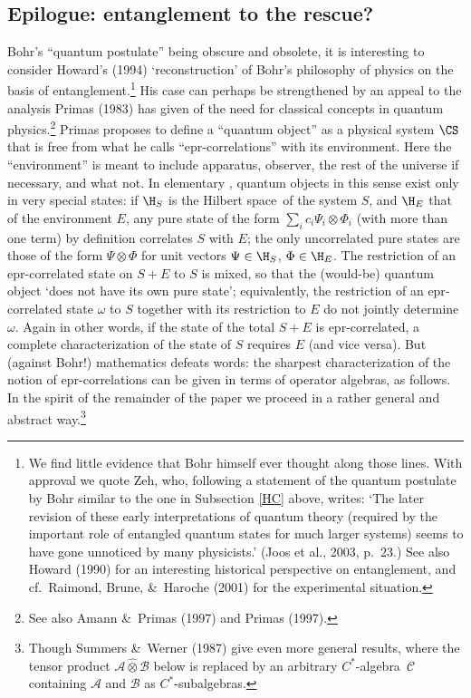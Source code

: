 \documentclass[12pt,titlepage]{article}
\newcommand{\epr}{{\sc epr}}
\newcommand{\ca}{$C^*$-algebra} \newcommand{\jba}{JB-algebra}
\newcommand{\Hs}{Hilbert space} \newcommand{\Bs}{Banach space}
\newcommand{\ot}{\otimes}
\newcommand{\om}{\omega} \newcommand{\Om}{\Omega}
\newcommand{\CA}{{\mathcal A}} \newcommand{\CB}{{\mathcal B}}
\newcommand{\CC}{{\mathcal C}} \newcommand{\CF}{{\mathcal F}}
\begin{document}
\subsection{Epilogue: entanglement to the rescue?}\label{primas}
Bohr's ``quantum postulate'' being obscure and obsolete, it is interesting to consider Howard's (1994)  `reconstruction' of Bohr's philosophy of physics on the basis of entanglement.\footnote{We find little evidence that Bohr himself ever thought along those lines.  With approval we quote Zeh, who, following a statement of the quantum postulate by Bohr similar to the one in Subsection \ref{HC} above, writes: 
`The later revision of these early interpretations of quantum theory (required by the important role of entangled quantum states for much larger systems) seems to have gone unnoticed by many physicists.' (Joos et al., 2003, p.\ 23.) 
See also Howard (1990) for an interesting historical perspective on entanglement, and cf.\ 
Raimond, Brune,  \&\ Haroche (2001) for the experimental situation.
} His case can perhaps be strengthened by an appeal to the analysis Primas (1983) has given of the need for classical concepts in quantum physics.\footnote{See also Amann \&\ Primas (1997) and Primas (1997).}
Primas proposes to define a ``quantum object'' as a physical system $\CS$ that  is free from what he calls ``\epr-correlations'' with its environment. Here the ``environment'' is meant to include apparatus, observer, the rest of the universe if necessary, and what not.  In elementary \qm,  quantum objects in this sense exist only in very special states: if $\H_S$ is the \Hs\ of the system $S$, and $\H_E$ that of the environment $E$, any pure state of the form
$\sum_i c_i \Psi_i\ot\Phi_i$ (with more than one term) by definition correlates $S$ with $E$; the only uncorrelated pure states are those of the form $\Psi\ot\Phi$ for unit vectors $\Psi\in \H_S$, $\Phi\in\H_E$.
The restriction of an \epr-correlated state on $S+E$ to $S$ is mixed, so that the (would-be) quantum object `does not have its own pure state'; equivalently, the restriction of an \epr-correlated state $\om$ to $S$ together with its restriction to $E$ do not jointly determine $\om$. Again in other words, if the state of the total $S+E$ is \epr-correlated, a complete characterization of the state of $S$ requires $E$ (and vice versa). But (against Bohr!) mathematics defeats words: the sharpest characterization of the notion of \epr-correlations can be given in terms of operator algebras, as follows.  
In the spirit of the remainder of the paper we proceed in a rather general and abstract way.\footnote{Though Summers \&\ Werner (1987) give even more general results, where the tensor product $\CA\hat{\ot}\CB$ below is replaced
by an arbitrary \ca\ $\CC$ containing $\CA$ and $\CB$ as $C^*$-subalgebras.
}
\end{document}
